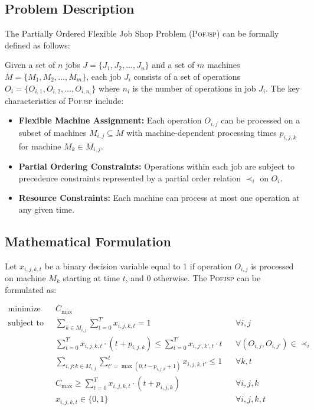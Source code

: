 \documentclass[11pt,a4paper]{article}
\newcommand{\pofjsp}{\textsc{Pofjsp}}
\begin{document}
\subsection{Problem Description}

The Partially Ordered Flexible Job Shop Problem (\pofjsp) can be formally defined as follows:

Given a set of $n$ jobs $J = \{J_1, J_2, \ldots, J_n\}$ and a set of $m$ machines $M = \{M_1, M_2, \ldots, M_m\}$, each job $J_i$ consists of a set of operations $O_i = \{O_{i,1}, O_{i,2}, \ldots, O_{i,n_i}\}$ where $n_i$ is the number of operations in job $J_i$. The key characteristics of \pofjsp{} include:

\begin{itemize}
    \item \textbf{Flexible Machine Assignment:} Each operation $O_{i,j}$ can be processed on a subset of machines $M_{i,j} \subseteq M$ with machine-dependent processing times $p_{i,j,k}$ for machine $M_k \in M_{i,j}$.
    \item \textbf{Partial Ordering Constraints:} Operations within each job are subject to precedence constraints represented by a partial order relation $\prec_i$ on $O_i$.
    \item \textbf{Resource Constraints:} Each machine can process at most one operation at any given time.
\end{itemize}

\subsection{Mathematical Formulation}

Let $x_{i,j,k,t}$ be a binary decision variable equal to 1 if operation $O_{i,j}$ is processed on machine $M_k$ starting at time $t$, and 0 otherwise. The \pofjsp{} can be formulated as:

\begin{align}
\text{minimize} \quad & C_{\max} \label{eq:objective}\\
\text{subject to} \quad & \sum_{k \in M_{i,j}} \sum_{t=0}^{T} x_{i,j,k,t} = 1 && \forall i,j \label{eq:assignment}\\
& \sum_{t=0}^{T} x_{i,j,k,t} \cdot (t + p_{i,j,k}) \leq \sum_{t=0}^{T} x_{i,j',k',t} \cdot t && \forall (O_{i,j}, O_{i,j'}) \in \prec_i \label{eq:precedence}\\
& \sum_{i,j: k \in M_{i,j}} \sum_{t'=\max(0,t-p_{i,j,k}+1)}^{t} x_{i,j,k,t'} \leq 1 && \forall k,t \label{eq:capacity}\\
& C_{\max} \geq \sum_{t=0}^{T} x_{i,j,k,t} \cdot (t + p_{i,j,k}) && \forall i,j,k \label{eq:makespan}\\
& x_{i,j,k,t} \in \{0,1\} && \forall i,j,k,t \label{eq:binary}
\end{align}
\end{document}
